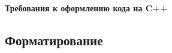 \documentclass[11pt,a4paper,oneside]{article}
\begin{document}
\renewcommand{\t}[1]{\mbox{\texttt{#1}}}
\newcommand{\s}[1]{\mbox{``\t{#1}''}}
\newcommand{\eps}{\varepsilon}
\renewcommand{\phi}{\varphi}
\newcommand{\plainhat}{{\char 94}}

\newcommand{\Z}{\mathbb{Z}}
\newcommand{\w}[1]{``\t{#1}''}




\begin{LARGE} \textbf{Требования к оформлению кода на C++} \end{LARGE}
\newline
\subsection*{Форматирование}
\end{document}
